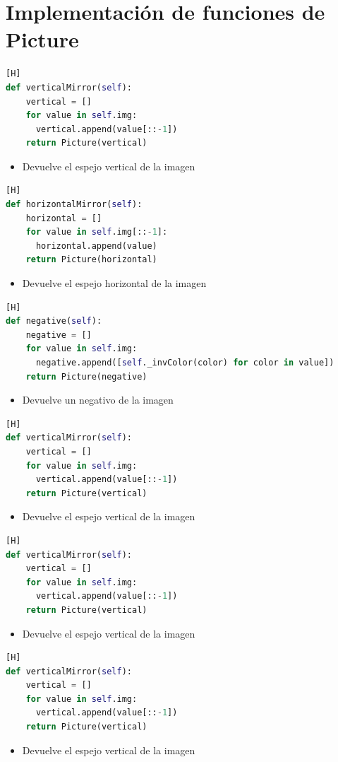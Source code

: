 \documentclass{article}
\begin{document}
\section{Implementación de funciones de Picture}
	\begin{lstlisting}[language=Python,caption={Función verticalMirror(self)}][H]
def verticalMirror(self):
    vertical = []
    for value in self.img:
      vertical.append(value[::-1])
    return Picture(vertical)
	\end{lstlisting}
	\begin{itemize}
		\item Devuelve el espejo vertical de la imagen 
	\end{itemize}
	\begin{lstlisting}[language=Python,caption={Función horizontalMirror(self)}][H]
def horizontalMirror(self):
    horizontal = []
    for value in self.img[::-1]:
      horizontal.append(value)
    return Picture(horizontal)
	\end{lstlisting}
	\begin{itemize}
		\item Devuelve el espejo horizontal de la imagen
	\end{itemize}
	\begin{lstlisting}[language=Python,caption={Función negative(self)}][H]
def negative(self):
    negative = []
    for value in self.img:
      negative.append([self._invColor(color) for color in value])
    return Picture(negative)
	\end{lstlisting}
	\begin{itemize}
		\item Devuelve un negativo de la imagen 
	\end{itemize}
	\begin{lstlisting}[language=Python,caption={Función VerticalMirror()}][H]
def verticalMirror(self):
    vertical = []
    for value in self.img:
      vertical.append(value[::-1])
    return Picture(vertical)
	\end{lstlisting}
	\begin{itemize}
		\item Devuelve el espejo vertical de la imagen 
	\end{itemize}
	\begin{lstlisting}[language=Python,caption={Función VerticalMirror()}][H]
def verticalMirror(self):
    vertical = []
    for value in self.img:
      vertical.append(value[::-1])
    return Picture(vertical)
	\end{lstlisting}
	\begin{itemize}
		\item Devuelve el espejo vertical de la imagen 
	\end{itemize}
	\begin{lstlisting}[language=Python,caption={Función VerticalMirror()}][H]
def verticalMirror(self):
    vertical = []
    for value in self.img:
      vertical.append(value[::-1])
    return Picture(vertical)
	\end{lstlisting}
	\begin{itemize}
		\item Devuelve el espejo vertical de la imagen 
	\end{itemize}
\end{document}
